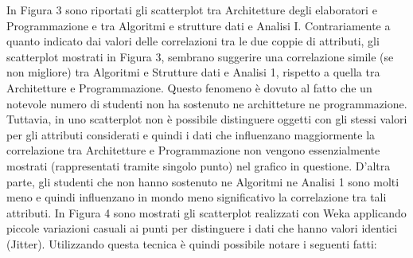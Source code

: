 \documentclass[12pt]{article}
\begin{document}
In Figura 3 sono riportati gli scatterplot tra Architetture degli elabora\-tori e Programmazione e tra Algoritmi e strutture dati  e Analisi I.
Contraria\-mente a quanto indicato dai valori delle correlazioni tra le due coppie di attributi, 
gli scatterplot mostrati in Figura 3, sembrano suggerire una correlazione simile (se non migliore) tra Algoritmi e Strutture dati e Analisi 1, rispetto a quella tra Architetture e Programmazione.
Questo fenomeno è dovuto al fatto che un notevole numero di studenti non ha sostenuto ne architteture ne programmazione. 
Tuttavia, in uno scatterplot non è possibile distinguere oggetti con gli stessi valori per gli attributi considerati e quindi i dati che influenzano maggiormente la correlazione tra Architetture e Programmazione non vengono essenzialmente mostrati (rappresentati tramite singolo punto) nel grafico in questione.  
D'altra parte, gli studenti che non hanno sostenuto ne Algoritmi ne Analisi 1 sono molti meno e quindi influenzano in mondo meno significativo la correlazione tra tali attributi. 
In Figura 4 sono mostrati gli scatterplot realizzati con Weka applicando piccole variazioni casuali ai punti per distinguere i dati che hanno valori identici (Jitter). 
Utilizzando questa tecnica è quindi possibile notare i seguenti fatti:
\end{document}
